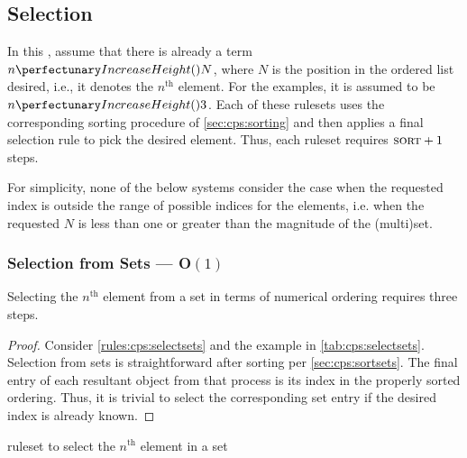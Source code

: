 \subsection{Selection}\label{sec:cps:selection}

In this , assume that there is already a term \(\cpfunc{n}{N}\), where \(N\) is the position in the ordered list desired, i.e., it denotes the \(n^{\text{th}}\) element.  For the examples, it is assumed to be \(\cpfunc{n}{3}\).  Each of these \glspl{ruleset} uses the corresponding sorting procedure of \cref{sec:cps:sorting} and then applies a final selection rule to pick the desired element.  Thus, each \gls{ruleset} requires \(\textsc{sort} + 1\) steps.

For simplicity, none of the below systems consider the case when the requested index is outside the range of possible indices for the elements, i.e. when the requested \(N\) is less than one or greater than the magnitude of the (multi)set.

\subsubsection{Selection from Sets --- O\((1)\)}\label{sec:cps:selectsets}

\begin{proposition}\label{prop:cps:selectsets}
Selecting the \(n^{\text{th}}\) element from a set in terms of numerical ordering requires three steps.
\end{proposition}

\begin{proof}
Consider \cref{rules:cps:selectsets} and the example in \cref{tab:cps:selectsets}.  Selection from sets is straightforward after sorting per \cref{sec:cps:sortsets}.  The final entry of each resultant object from that process is its index in the properly sorted ordering.  Thus, it is trivial to select the corresponding set entry if the desired index is already known.
\end{proof}

\begin{cprulesetfloat}
\begin{cpruleset}


\end{cpruleset}
\caption{\label{rules:cps:selectsets}\Gls{ruleset} to select the \(n^{\text{th}}\) element in a set}
\end{cprulesetfloat}

